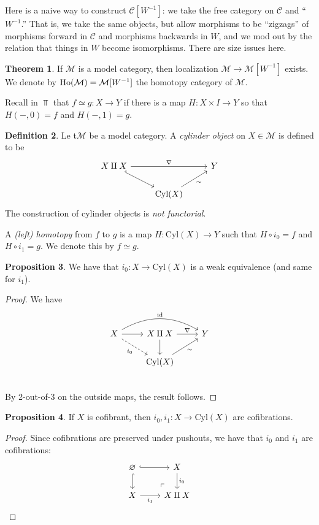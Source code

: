 \documentclass[12pt]{amsart}
\theoremstyle{definition}
\newtheorem{theorem}{Theorem}[section]
\newtheorem{definition}[theorem]{Definition}
\newtheorem{proposition}[theorem]{Proposition}
\let\emptyset\varnothing
\providecommand{\Cyl}{\text{Cyl}}
\begin{document}
Here is a naive way to construct $\mathscr{C}[W^{-1}]$: we take the free category on $\mathscr{C}$ and ``$W^{-1}$.'' That is, we take the same objects, but allow morphisms to be ``zigzags'' of morphisms forward in $\mathscr{C}$ and morphisms backwards in $W$, and we mod out by the relation that things in $W$ become isomorphisms. There are size issues here.

\begin{theorem} If $\mathcal{M}$ is a model category, then localization $\mathcal{M} \to \mathcal{M}[W^{-1}]$ exists. We denote by $\text{Ho}(\mathcal{M}) = \mathcal{M}[W^{-1}]$ the homotopy category of $\mathcal{M}$.
\end{theorem}

Recall in $\Top$ that $f \simeq g : X \to Y$ if there is a map $H: X \times I \to Y$ so that $H(-,0) = f$ and $H(-,1) = g$. 

\begin{definition} Le t$\mathcal{M}$ be a model category. A \textit{cylinder object} on $X\in \mathcal{M}$ is defined to be
\[ \begin{tikzcd}
    X\amalg X\ar[rr,"\nabla"]\ar[dr,hook] &  & Y\\
     & \Cyl(X)\ar[ur,"\sim" below right] &
\end{tikzcd} \]
The construction of cylinder objects is \textit{not functorial}.
\end{definition}

A \textit{(left) homotopy} from $f$ to $g$ is a map $H: \Cyl(X) \to Y$ such that $H\circ i_0 = f$ and $H\circ i_1 = g$. We denote this by $f\simeq g$.

\begin{proposition} We have that $i_0 : X \to \Cyl(X)$ is a weak equivalence (and same for $i_1$).
\end{proposition}
\begin{proof} We have
\[\begin{tikzcd}
    X\ar[rr,"\id", bend left=30]\ar[dr,dashed,"i_0" below left]\rar & X\amalg X\rar["\nabla"]\dar & Y\\
     & \Cyl(X)\ar[ur,"\sim" below right] & \\
\end{tikzcd} \]
By 2-out-of-3 on the outside maps, the result follows.
\end{proof}

\begin{proposition} If $X$ is cofibrant, then $i_0,i_1: X \to \Cyl(X)$ are cofibrations.
\end{proposition}
\begin{proof} Since cofibrations are preserved under pushouts, we have that $i_0$ and $i_1$ are cofibrations:
\[ \begin{tikzcd}
    \emptyset\rar[hook]\dar[hook] & X\dar["i_0" right]\\
    X\rar["i_1" below] & X \amalg X \po
\end{tikzcd} \]
\end{proof}
\end{document}
